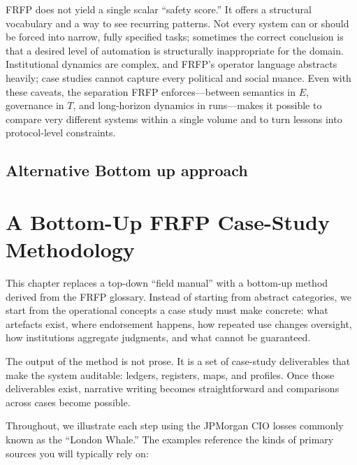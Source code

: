 FRFP does not yield a single scalar ``safety score.'' It offers a structural vocabulary and a way to see recurring patterns. Not every system can or should be forced into narrow, fully specified tasks; sometimes the correct conclusion is that a desired level of automation is structurally inappropriate for the domain. Institutional dynamics are complex, and FRFP’s operator language abstracts heavily; case studies cannot capture every political and social nuance. Even with these caveats, the separation FRFP enforces---between semantics in \(E\), governance in \(T\), and long-horizon dynamics in runs---makes it possible to compare very different systems within a single volume and to turn lessons into protocol-level constraints.
\section{Alternative Bottom up approach}

\chapter{A Bottom-Up FRFP Case-Study Methodology}
\label{ch:frfp-bottom-up-method}

This chapter replaces a top-down “field manual” with a bottom-up method derived from the FRFP glossary.
Instead of starting from abstract categories, we start from the operational concepts a case study must
make concrete: what artefacts exist, where endorsement happens, how repeated use changes oversight,
how institutions aggregate judgments, and what cannot be guaranteed.

The output of the method is not prose. It is a set of case-study deliverables that make the system
auditable: ledgers, registers, maps, and profiles. Once those deliverables exist, narrative writing
becomes straightforward and comparisons across cases become possible.

Throughout, we illustrate each step using the JPMorgan CIO losses commonly known as the “London Whale.”
The examples reference the kinds of primary sources you will typically rely on:

